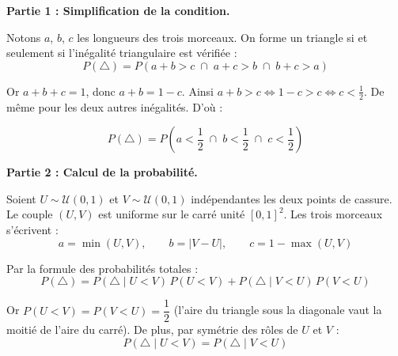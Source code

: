 \textbf{Partie 1 : Simplification de la condition.}

\bigskip

Notons $a$, $b$, $c$ les longueurs des trois morceaux. On forme un triangle si et seulement si l'inégalité triangulaire est vérifiée :
\[
P(\triangle) = P(a + b > c \;\cap\; a + c > b \;\cap\; b + c > a)
\]

Or $a + b + c = 1$, donc $a + b = 1 - c$. Ainsi $a + b > c \iff 1 - c > c \iff c < \frac{1}{2}$. De même pour les deux autres inégalités. D'où :

\[
\boxed{P(\triangle) = P\!\left(a < \frac{1}{2} \;\cap\; b < \frac{1}{2} \;\cap\; c < \frac{1}{2}\right)}
\]

\bigskip

\textbf{Partie 2 : Calcul de la probabilité.}

\bigskip

Soient $U \sim \mathcal{U}(0,1)$ et $V \sim \mathcal{U}(0,1)$ indépendantes les deux points de cassure. Le couple $(U,V)$ est uniforme sur le carré unité $[0,1]^2$. Les trois morceaux s'écrivent :
\[
a = \min(U,V), \qquad b = |V - U|, \qquad c = 1 - \max(U,V)
\]

\begin{center}
\end{center}

\bigskip

Par la formule des probabilités totales :
\[
P(\triangle) = P(\triangle \mid U < V)\,P(U < V) + P(\triangle \mid V < U)\,P(V < U)
\]

Or $P(U < V) = P(V < U) = \dfrac{1}{2}$ (l'aire du triangle sous la diagonale vaut la moitié de l'aire du carré). De plus, par symétrie des rôles de $U$ et $V$ :
\[
P(\triangle \mid U < V) = P(\triangle \mid V < U)
\]

